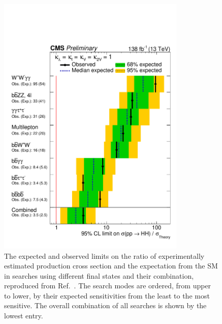 \begin{figure}[htb!]
    \centering
    \includegraphics[width=0.8\textwidth]{figures/05-HH/CMS-results/HHcomb_xsec.pdf}
    \caption[The expected and observed limits on the ratio of experimentally estimated production cross section and the expectation from the SM in searches using different final states and their combination, reproduced from Ref.~\cite{CMS-PAS-HIG-20-011}.]{The expected and observed limits on the ratio of experimentally estimated production cross section and the expectation from the SM in searches using different final states and their combination, reproduced from Ref.~\cite{CMS-PAS-HIG-20-011}. 
    The search modes are ordered, from upper to lower, by their expected sensitivities from the least to the most sensitive. The overall combination of all searches is shown by the lowest entry.}
    \label{fig:05_hh_comb_xsec}
\end{figure}

